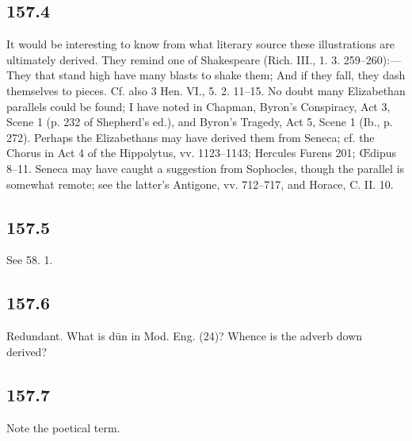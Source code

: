 \subsection*{157.4}

It would be interesting to know from what literary source these illustrations are ultimately derived. They remind one of Shakespeare (Rich. III., 1. 3. 259–260):— They that stand high have many blasts to shake them; And if they fall, they dash themselves to pieces. Cf. also 3 Hen. VI., 5. 2. 11–15. No doubt many Elizabethan parallels could be found; I have noted in Chapman, Byron’s Conspiracy, Act 3, Scene 1 (p. 232 of Shepherd’s ed.), and Byron’s Tragedy, Act 5, Scene 1 (Ib., p. 272). Perhaps the Elizabethans may have derived them from Seneca; cf. the Chorus in Act 4 of the Hippolytus, vv. 1123–1143; Hercules Furens 201; Œdipus 8–11. Seneca may have caught a suggestion from Sophocles, though the parallel is somewhat remote; see the latter’s Antigone, vv. 712–717, and Horace, C. II. 10.

\subsection*{157.5}

See 58. 1.

\subsection*{157.6}

Redundant. What is dūn in Mod. Eng. (24)? Whence is the adverb down derived?

\subsection*{157.7}

Note the poetical term.

